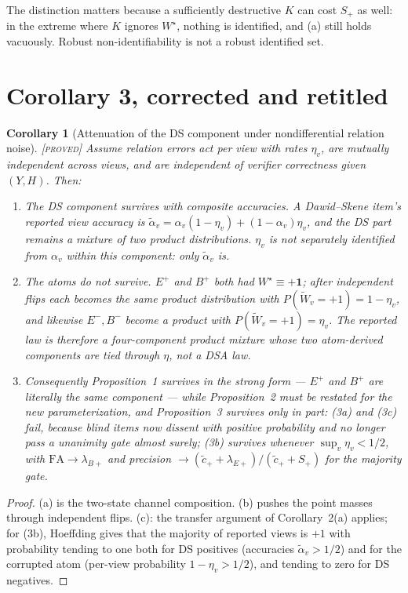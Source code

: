 \documentclass[11pt]{article}
\newtheorem{corollary}{Corollary}
\theoremstyle{remark}
\newcommand{\status}[1]{\hfill{\normalfont\small\textsc{[#1]}}}
\newcommand{\one}{\mathbf{1}}
\newcommand{\Wt}{\widetilde{W}}
\begin{document}
The distinction matters because a sufficiently destructive $K$ can cost $S_+$ as well: in the extreme where $K$ ignores $W^\star$, nothing is identified, and (a) still holds vacuously. Robust non-identifiability is not a robust identified set.

\section*{Corollary 3, corrected and retitled}

\begin{corollary}[Attenuation of the DS component under nondifferential relation noise]\status{proved}
Assume relation errors act per view with rates $\eta_v$, are mutually independent across views, and are independent of verifier correctness given $(Y,H)$. Then:
\begin{enumerate}
\item[(a)] \emph{The DS component survives with composite accuracies.} A Dawid--Skene item's reported view accuracy is $\tilde\alpha_v=\alpha_v(1-\eta_v)+(1-\alpha_v)\eta_v$, and the DS part remains a mixture of two product distributions. $\eta_v$ is not separately identified from $\alpha_v$ within this component: only $\tilde\alpha_v$ is.
\item[(b)] \emph{The atoms do not survive.} $E^+$ and $B^+$ both had $W^\star\equiv+\one$; after independent flips each becomes the \emph{same} product distribution with $P(\Wt_v=+1)=1-\eta_v$, and likewise $E^-,B^-$ become a product with $P(\Wt_v=+1)=\eta_v$. The reported law is therefore a four-component product mixture whose two atom-derived components are tied through $\eta$, not a DSA law.
\item[(c)] Consequently Proposition~1 survives in the strong form --- $E^+$ and $B^+$ are literally the same component --- while Proposition~2 must be restated for the new parameterization, and Proposition~3 survives only in part: (3a) and (3c) fail, because blind items now dissent with positive probability and no longer pass a unanimity gate almost surely; (3b) survives whenever $\sup_v\eta_v<1/2$, with $\mathrm{FA}\to\lambda_{B+}$ and precision $\to(\tilde c_++\lambda_{E+})/(\tilde c_++S_+)$ for the majority gate.
\end{enumerate}
\end{corollary}
\begin{proof}
(a) is the two-state channel composition. (b) pushes the point masses through independent flips. (c): the transfer argument of Corollary~2(a) applies; for (3b), Hoeffding gives that the majority of reported views is $+1$ with probability tending to one both for DS positives (accuracies $\tilde\alpha_v>1/2$) and for the corrupted atom (per-view probability $1-\eta_v>1/2$), and tending to zero for DS negatives.
\end{proof}
\end{document}
